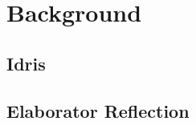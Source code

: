 \section{Background} \label{sec:background}

\subsection{Idris}

\subsection{Elaborator Reflection} \label{ssec:elabref}

